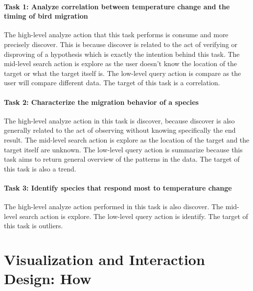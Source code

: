 \documentclass[journal]{vgtc}                %
\begin{document}
\paragraph{Task 1: Analyze correlation between temperature change and the timing of bird migration} The high-level analyze action that this task performs is consume and more precisely discover. This is because discover is related to the act of verifying or disproving of a hypothesis which is exactly the intention behind this task. The mid-level search action is explore as the user doesn't know the location of the target or what the target itself is. The low-level query action is compare as the user will compare different data. The target of this task is a correlation.

\paragraph{Task 2: Characterize the migration behavior of a species} The high-level analyze action in this task is discover, because discover is also generally related to the act of observing without knowing specifically the end result. The mid-level search action is explore as the location of the target and the target itself are unknown. The low-level query action is summarize because this task aims to return general overview of the patterns in the data. The target of this task is also a trend.

\paragraph{Task 3: Identify species that respond most to temperature change} The high-level analyze action performed in this task is also discover. The mid-level search action is explore. The low-level query action is identify. The target of this task is outliers.

\section{Visualization and Interaction Design: How}

\end{document}
